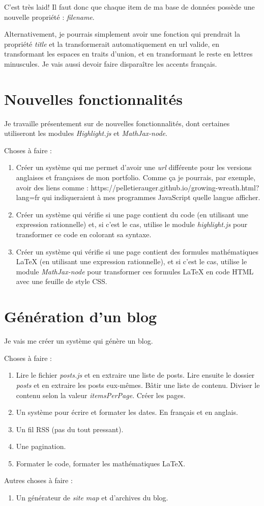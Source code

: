 C'est très laid! Il faut donc que chaque item de ma base de données possède une nouvelle propriété : \textit{filename}.

Alternativement, je pourrais simplement avoir une fonction qui prendrait la propriété \textit{title} et la transformerait automatiquement en url valide, en transformant les espaces en traits d'union, et en transformant le reste en lettres minuscules. Je vais aussi devoir faire disparaître les accents français.

\clearpage
\section{Nouvelles fonctionnalités}

Je travaille présentement sur de nouvelles fonctionnalités, dont certaines utiliseront les modules \textit{Highlight.js} et \textit{MathJax-node}.

Choses à faire :
\begin{enumerate}  
\item Créer un système qui me permet d'avoir une \textit{url} différente pour les versions anglaises et françaises de mon portfolio. Comme ça je pourrais, par exemple, avoir des liens comme : https://pelletierauger.github.io/growing-wreath.html?lang=fr qui indiqueraient à mes programmes JavaScript quelle langue afficher.
\item Créer un système qui vérifie si une page contient du code (en utilisant une expression rationnelle) et, si c'est le cas, utilise le module \textit{highlight.js} pour transformer ce code en colorant sa syntaxe.
\item Créer un système qui vérifie si une page contient des formules mathématiques LaTeX (en utilisant une expression rationnelle), et si c'est le cas, utilise le module \textit{MathJax-node} pour transformer ces formules LaTeX en code HTML avec une feuille de style CSS.
\end{enumerate}

\newpage
\section{Génération d'un blog}
Je vais me créer un système qui génère un blog.

Choses à faire :
\begin{enumerate}  
\item Lire le fichier \textit{posts.js} et en extraire une liste de posts. Lire ensuite le dossier \textit{posts} et en extraire les posts eux-mêmes. Bâtir une liste de contenu. Diviser le contenu selon la valeur \textit{itemsPerPage}. Créer les pages.
\item Un système pour écrire et formater les dates. En français et en anglais.
\item Un fil RSS (pas du tout pressant).
\item Une pagination.
\item Formater le code, formater les mathématiques LaTeX.
\end{enumerate}

Autres choses à faire : 
\begin{enumerate}  
\item Un générateur de \textit{site map} et d'archives du blog.
\end{enumerate}